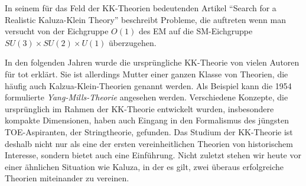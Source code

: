 In seinem für das
Feld der KK-Theorien bedeutenden Artikel \enquote{Search for a Realistic
Kaluza-Klein Theory} beschreibt
 Probleme, die auftreten wenn man versucht 
von der Eichgruppe $O(1)$ des EM auf die SM-Eichgruppe $SU(3)\times SU(2) \times
U(1)$ überzugehen.
%

In den folgenden Jahren wurde die ursprüngliche KK-Theorie von vielen
Autoren für tot erklärt.
Sie ist allerdings Mutter einer ganzen Klasse von Theorien, die häufig auch
Kalzua-Klein-Theorien genannt werden. Als Beispiel kann die 1954 formulierte 
\emph{Yang-Mills-Theorie} angesehen werden.
Verschiedene Konzepte, die ursprünglich im
Rahmen der KK-Theorie entwickelt wurden, insbesondere kompakte Dimensionen,
haben auch Eingang in den Formalismus des jüngsten
TOE-Aspiranten, der Stringtheorie, gefunden.
Das Studium der KK-Theorie ist deshalb nicht nur als eine der ersten
vereinheitlichen Theorien von historischem Interesse, sondern bietet auch eine
Einführung. Nicht zuletzt stehen wir heute vor einer ähnlichen Situation
wie Kaluza, in der es gilt, zwei überaus erfolgreiche Theorien miteinander zu vereinen. 

